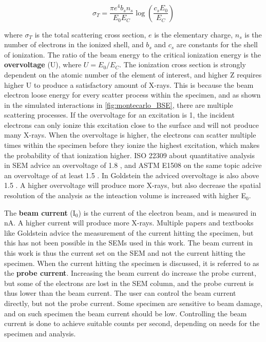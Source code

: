 \begin{equation}
    \sigma_T = \frac{\pi e^4 b_s n_s}{E_0 E_C}  \log\left(\frac{c_s E_0}{E_C}\right)
\end{equation}

where $\sigma_T$ is the total scattering cross section, $e$ is the elementary charge, $n_s$ is the number of electrons in the ionized shell, and $b_s$ and $c_s$ are constants for the shell of ionization.
The ratio of the beam energy to the critical ionization energy is the \textbf{overvoltage} (U), where $ U = E_0/E_C$.
The ionization cross section is strongly dependent on the atomic number of the element of interest, and higher Z requires higher U to produce a satisfactory amount of X-rays.
This is because the beam electron loose energy for every scatter process within the specimen, and as shown in the simulated interactions in \cref{fig:montecarlo_BSE}, there are multiple scattering processes.
If the overvoltage for an excitation is 1, the incident electrons can only ionize this excitation close to the surface and will not produce many X-rays.
When the overvoltage is higher, the electrons can scatter multiple times within the specimen before they ionize the highest excitation, which makes the probability of that ionization higher.
ISO 22309 about quantitative analysis in SEM advice an overvoltage of 1.8 \cite{iso_emsa_22029}, and ASTM E1508 on the same topic adcive an overvoltage of at least 1.5 \cite{astm_e1508_eds_quantification}.
In Goldstein the adviced overvoltage is also above 1.5 \cite[Ch. 20.2.2]{goldstein_scanning_2018}.
A higher overvoltage will produce more X-rays, but also decrease the spatial resolution of the analysis as the inteaction volume is increased with higher E$_0$.


The \textbf{beam current} (I$_0$) is the current of the electron beam, and is measured in nA.
A higher current will produce more X-rays.
Multiple papers and textbooks like Goldstein advice the measurement of the current hitting the specimen, but this has not been possible in the SEMs used in this work.
The beam current in this work is thus the current set on the SEM and not the current hitting the specimen.
When the current hitting the specimen is discussed, it is referred to as the \textbf{probe current}.
Increasing the beam current do increase the probe current, but some of the electrons are lost in the SEM column, and the probe current is thus lower than the beam current.
The user can control the beam current directly, but not the probe current.
Some specimen are sensitive to beam damage, and on such specimen the beam current should be low.
Controlling the beam current is done to achieve suitable counts per second, depending on needs for the specimen and analysis.


